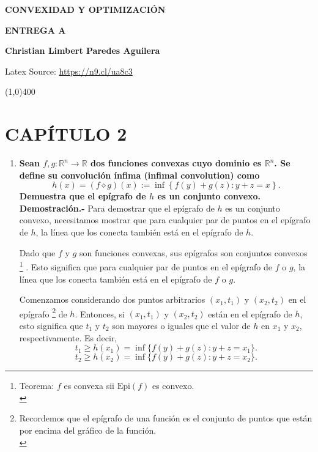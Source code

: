 \begin{center}
\textbf{CONVEXIDAD Y OPTIMIZACIÓN}

\textbf{\Large ENTREGA A}

\textbf{ \textbf{Christian Limbert Paredes Aguilera}}
\end{center}
\begin{center}
    Latex Source: \url{https://n9.cl/ua8c3}
\end{center}

\line(1,0){400}


\section*{CAPÍTULO 2}

\begin{enumerate}

    \item \textbf{\boldmath Sean $f, g : \mathbb{R}^n\to \mathbb{R}$ dos funciones convexas cuyo dominio es $\mathbb{R}^n$. Se define su convolución ínfima (infimal convolution) como
    $$ h(x) = (f \diamond g)(x) := \inf\left\{f(y) + g(z) : y + z = x\right\}.$$
    Demuestra que el epígrafo de $h$ es un conjunto convexo.}\\

	\textbf{Demostración.-}\; Para demostrar que el epígrafo de $h$ es un conjunto convexo, necesitamos mostrar que para cualquier par de puntos en el epígrafo de $h$, la línea que los conecta también está en el epígrafo de $h$.

	Dado que $f$ y $g$ son funciones convexas, sus epígrafos son conjuntos convexos 
	\footnote{
	    Teorema: $f$ es convexa sii $\text{Epi}(f)$ es convexo.\\
	\label{teoEpiConvexo}}
	. Esto significa que para cualquier par de puntos en el epígrafo de $f$ o $g$, la línea que los conecta también está en el epígrafo de $f$ o $g$.

	Comenzamos considerando dos puntos arbitrarios $(x_1, t_1)$ y $(x_2, t_2)$ en el epígrafo
	\footnote{
	    Recordemos que el epígrafo de una función es el conjunto de puntos que están por encima del gráfico de la función.\\
	\label{epigrafo}}
	de $h$. Entonces, si $(x_1, t_1)$ y $(x_2, t_2)$ están en el epígrafo de $h$, esto significa que $t_1$ y $t_2$ son mayores o iguales que el valor de $h$ en $x_1$ y $x_2$, respectivamente. Es decir,
	$$t_1 \geq h(x_1) = \inf\{f(y) + g(z) : y + z = x_1\}.$$
	$$t_2 \geq h(x_2) = \inf\{f(y) + g(z) : y + z = x_2\}.$$


\end{enumerate}
